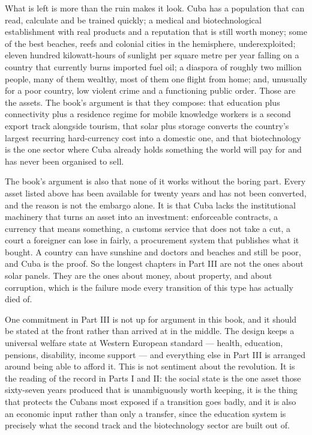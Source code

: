What is left is more than the ruin makes it look. Cuba has a population that
can read, calculate and be trained quickly; a medical and biotechnological
establishment with real products and a reputation that is still worth money;
some of the best beaches, reefs and colonial cities in the hemisphere,
underexploited; eleven hundred kilowatt-hours of sunlight per square metre per
year falling on a country that currently burns imported fuel oil; a diaspora of
roughly two million people, many of them wealthy, most of them one flight from
home; and, unusually for a poor country, low violent crime and a functioning
public order. Those are the assets. The book's argument is that they compose:
that education plus connectivity plus a residence regime for mobile knowledge
workers is a second export track alongside tourism, that solar plus storage
converts the country's largest recurring hard-currency cost into a domestic
one, and that biotechnology is the one sector where Cuba already holds
something the world will pay for and has never been organised to sell.

The book's argument is also that none of it works without the boring part.
Every asset listed above has been available for twenty years and has not been
converted, and the reason is not the embargo alone. It is that Cuba lacks the
institutional machinery that turns an asset into an investment: enforceable
contracts, a currency that means something, a customs service that does not
take a cut, a court a foreigner can lose in fairly, a procurement system that
publishes what it bought. A country can have sunshine and doctors and beaches
and still be poor, and Cuba is the proof. So the longest chapters in Part III
are not the ones about solar panels. They are the ones about money,
about property, and about corruption, which is the failure mode every
transition of this type has actually died of.

One commitment in Part III is not up for argument in this book, and it should
be stated at the front rather than arrived at in the middle. The design keeps a
universal welfare state at Western European standard --- health, education,
pensions, disability, income support --- and everything else in Part III is
arranged around being able to afford it. This is not sentiment about the
revolution. It is the reading of the record in Parts I and II: the social state
is the one asset those sixty-seven years produced that is unambiguously worth
keeping, it is the thing that protects the Cubans most exposed if a transition
goes badly, and it is also an economic input rather than only a transfer, since
the education system is precisely what the second track and the biotechnology
sector are built out of.

